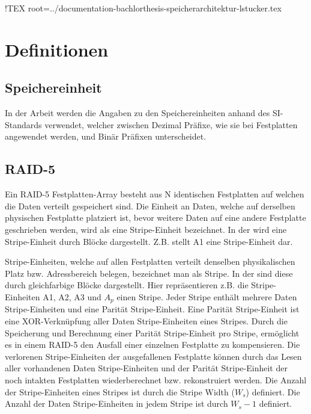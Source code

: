 !TEX root=../documentation-bachlorthesis-speicherarchitektur-lstucker.tex

\cleardoublepage
\chapter{Definitionen}

\section{Speichereinheit}
In der Arbeit werden die Angaben zu den Speichereinheiten anhand des SI-Standards \cite{Technology1998} verwendet, welcher zwischen Dezimal Präfixe, wie sie bei Festplatten angewendet werden, und Binär Präfixen unterscheidet.

\section{RAID-5}\label{RAID-5}

Ein RAID-5 Festplatten-Array besteht aus N identischen Festplatten auf welchen die Daten verteilt gespeichert sind. Die Einheit an Daten, welche auf derselben physischen Festplatte platziert ist, bevor weitere Daten auf eine andere Festplatte geschrieben werden, wird als eine Stripe-Einheit bezeichnet.
In der  wird eine Stripe-Einheit durch Blöcke dargestellt. Z.B. stellt A1 eine Stripe-Einheit dar. \cite{Kuratti1995}

Stripe-Einheiten, welche auf allen Festplatten verteilt denselben physikalischen Platz bzw. Adressbereich belegen, bezeichnet man als Stripe. In der  sind diese durch gleichfarbige Blöcke dargestellt. Hier repräsentieren z.B. die Stripe-Einheiten A1, A2, A3 und $A_{p}$ einen Stripe.
Jeder Stripe enthält mehrere Daten Stripe-Einheiten und eine Parität Stripe-Einheit. Eine Parität Stripe-Einheit ist eine XOR-Verknüpfung aller Daten Stripe-Einheiten eines Stripes. Durch die Speicherung und Berechnung einer Parität Stripe-Einheit pro Stripe, ermöglicht es in einem RAID-5 den Ausfall einer einzelnen Festplatte zu kompensieren. Die verlorenen Stripe-Einheiten der ausgefallenen Festplatte können durch das Lesen aller vorhandenen Daten Stripe-Einheiten und der Parität Stripe-Einheit der noch intakten Festplatten wiederberechnet bzw. rekonstruiert werden. Die Anzahl der Stripe-Einheiten eines Stripes ist durch die Stripe Width ($W_{s}$) definiert. Die Anzahl der Daten Stripe-Einheiten in jedem Stripe ist durch $W_{s} -1$ definiert. \cite{Kuratti1995}


